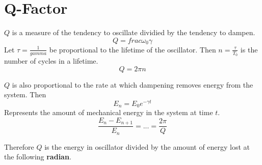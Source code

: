 \documentclass[a4paper,12pt]{report}
\begin{document}
\section{Q-Factor}
$Q$ is a measure of the tendency to oscillate dividied by the tendency to dampen.
$$Q = frac{\omega_0}{\gamma}$$
Let $\tau = \frac{1}{gamma}$ be proportional to the lifetime of the oscillator. Then 
$n = \frac{\tau}{T_0}$ is the number of cycles in a lifetime.
$$Q = 2\pi n$$


$Q$ is also proportional to the rate at which dampening removes energy from the system. Then
$$E_n = E_0e^{-\gamma t}$$
Represents the amount of mechanical energy in the system at time $t$.
$$\frac{E_n - E_{n+1}}{E_n} = ... = \frac{2\pi}{Q}$$

Therefore $Q$ is the energy in oscillator divided by the amount of energy lost at the
following \textbf{radian}.
\end{document}
